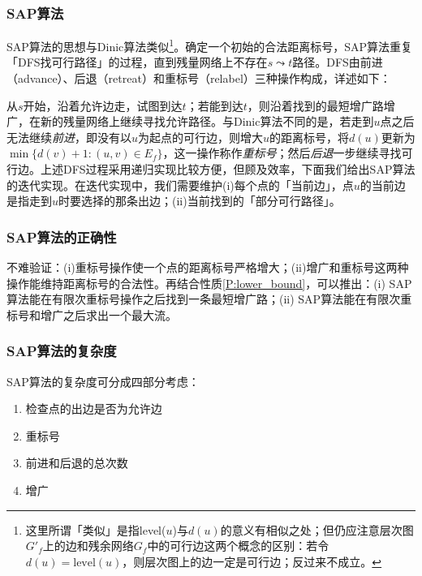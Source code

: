 \documentclass{ctexbook}
\begin{document}
  \subsubsection*{SAP算法}
  SAP算法的思想与Dinic算法类似\footnote{这里所谓「类似」是指level($u$)与$d(u)$的意义有相似之处；但仍应注意层次图$G'_f$上的边和残余网络$G_f$中的可行边这两个概念的区别：若令$d(u)=\mathrm{level}(u)$，则层次图上的边一定是可行边；反过来不成立。}。确定一个初始的合法距离标号，SAP算法重复「DFS找可行路径」的过程，直到残量网络上不存在$s\leadsto t$路径。DFS由前进（advance）、后退（retreat）和重标号（relabel）三种操作构成，详述如下：

  从$s$开始，沿着允许边走，试图到达$t$；若能到达$t$，则沿着找到的最短增广路增广，在新的残量网络上继续寻找允许路径。与Dinic算法不同的是，若走到$u$点之后无法继续\emph{前进}，即没有以$u$为起点的可行边，则增大$u$的距离标号，将$d(u)$更新为$\min\{d(v)+1\colon (u,v)\in E_f\}$，这一操作称作\emph{重标号}；然后\emph{后退}一步继续寻找可行边。上述DFS过程采用递归实现比较方便，但顾及效率，下面我们给出SAP算法的迭代实现。在迭代实现中，我们需要维护(i)每个点的「当前边」，点$u$的当前边是指走到$u$时要选择的那条出边；(ii)当前找到的「部分可行路径」。
  
  \subsubsection{SAP算法的正确性}
  不难验证：(i)重标号操作使一个点的距离标号严格增大；(ii)增广和重标号这两种操作能维持距离标号的合法性。再结合性质\ref{P:lower_bound}，可以推出：(i) SAP算法能在有限次重标号操作之后找到一条最短增广路；(ii) SAP算法能在有限次重标号和增广之后求出一个最大流。
  \subsubsection{SAP算法的复杂度}
  SAP算法的复杂度可分成四部分考虑：
  \begin{enumerate}
    \item 检查点的出边是否为允许边
    \item 重标号
    \item 前进和后退的总次数
    \item 增广
  \end{enumerate}
\end{document}
